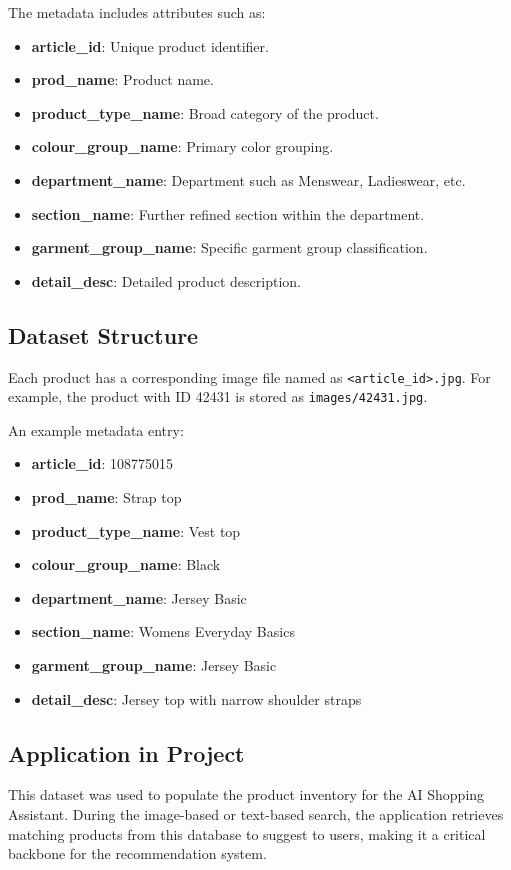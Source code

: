 The metadata includes attributes such as:

\vspace{-1.25em}
\begin{itemize}
    \setlength\itemsep{-1.5em}
    \item \textbf{article\_id}: Unique product identifier.
    \item \textbf{prod\_name}: Product name.
    \item \textbf{product\_type\_name}: Broad category of the product.
    \item \textbf{colour\_group\_name}: Primary color grouping.
    \item \textbf{department\_name}: Department such as Menswear, Ladieswear, etc.
    \item \textbf{section\_name}: Further refined section within the department.
    \item \textbf{garment\_group\_name}: Specific garment group classification.
    \item \textbf{detail\_desc}: Detailed product description.
\end{itemize}

\subsection{Dataset Structure}

Each product has a corresponding image file named as \texttt{<article\_id>.jpg}. For example, the product with ID 42431 is stored as \texttt{images/42431.jpg}.

An example metadata entry:

\vspace{-1.25em}
\begin{itemize}
    \setlength\itemsep{-1.5em}
    \item \textbf{article\_id}: 108775015
    \item \textbf{prod\_name}: Strap top
    \item \textbf{product\_type\_name}: Vest top
    \item \textbf{colour\_group\_name}: Black
    \item \textbf{department\_name}: Jersey Basic
    \item \textbf{section\_name}: Womens Everyday Basics
    \item \textbf{garment\_group\_name}: Jersey Basic
    \item \textbf{detail\_desc}: Jersey top with narrow shoulder straps
\end{itemize}

\subsection{Application in Project}

This dataset was used to populate the product inventory for the AI Shopping Assistant. During the image-based or text-based search, the application retrieves matching products from this database to suggest to users, making it a critical backbone for the recommendation system.